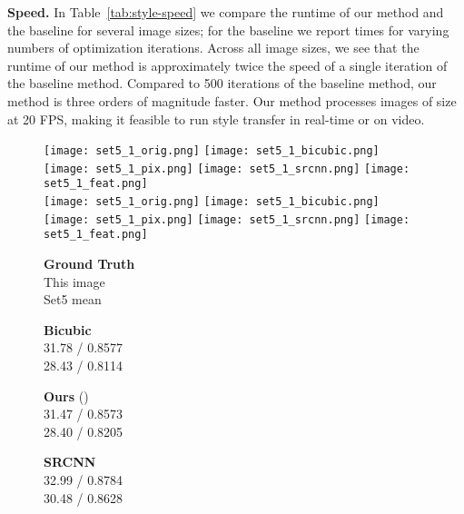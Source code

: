 \documentclass[runningheads]{llncs}
\begin{document}
\noindent \textbf{Speed.}
In Table~\ref{tab:style-speed} we compare the runtime of our method and the baseline
for several image sizes; for the baseline we report times for varying numbers of optimization
iterations. Across all image sizes, we see that the runtime of our method is approximately
twice the speed of a single iteration of the baseline method. Compared to 500 iterations of
the baseline method, our method is three orders of magnitude faster. Our method processes
images of size  at 20 FPS, making it feasible to run style transfer in
real-time or on video.

\def\mywidth{0.17\textwidth}
\begin{figure}[t]
  \centering
  \texttt{[image: set5\_1\_orig.png]}
  \texttt{[image: set5\_1\_bicubic.png]}
  \texttt{[image: set5\_1\_pix.png]}
  \texttt{[image: set5\_1\_srcnn.png]}
  \texttt{[image: set5\_1\_feat.png]} \\
  \texttt{[image: set5\_1\_orig.png]}
  \texttt{[image: set5\_1\_bicubic.png]}
  \texttt{[image: set5\_1\_pix.png]}
  \texttt{[image: set5\_1\_srcnn.png]}
  \texttt{[image: set5\_1\_feat.png]} \\
  \vspace{1mm}
  \begin{minipage}{0.20\textwidth}
    \centering \textbf{Ground Truth} \\ This image \\ Set5 mean
  \end{minipage}
  \hspace{-0.02\textwidth}
  \begin{minipage}{\mywidth}
    \centering \textbf{Bicubic} \\ 31.78 / 0.8577 \\ 28.43 / 0.8114
  \end{minipage}
  \begin{minipage}{\mywidth}
    \centering \textbf{Ours} () \\ 31.47 / 0.8573 \\ 28.40 / 0.8205
  \end{minipage}
  \begin{minipage}{\mywidth}
    \centering \textbf{SRCNN}~\cite{dong2014learning} \\ 32.99 / 0.8784 \\ 30.48 / 0.8628

\end{minipage}
\end{figure}
\end{document}
